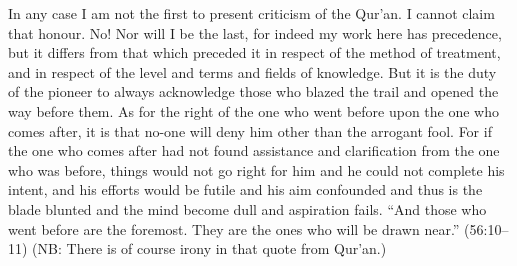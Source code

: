 \documentclass[12pt]{book}
\begin{document}

In any case I am not the first to present criticism of the Qur’an.
I cannot claim that honour.
No! Nor will I be the last, for indeed my work here has precedence,
but it differs from that which preceded it in
respect of the method of treatment,
and in respect of the level and terms and fields of knowledge.
But it is the duty of the pioneer to always acknowledge those
who blazed the trail and opened the way before them.
As for the right of the one who went before upon the one who comes after,
it is that no-one will deny him other than the arrogant fool.
For if the one who comes after had not found assistance and
clarification from the one who was before,
things would not go right for him and he could not complete his intent,
and his efforts would be futile and his aim confounded and
thus is the blade blunted and the mind become dull and aspiration fails.
“And those who went before are the foremost.
They are the ones who will be drawn near.” (56:10–11)
(NB: There is of course irony in that quote from Qur’an.)
\end{document}

